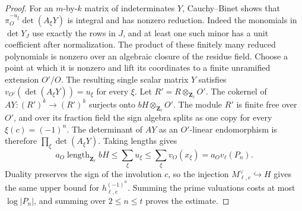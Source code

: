 \begin{proof}
For an \(m\)-by-\(k\) matrix of indeterminates \(Y\), Cauchy--Binet
shows that \(\pi_O^{-u_\xi}\det(A_\xi Y)\) is integral and has nonzero
reduction. Indeed the monomials in \(\det Y_J\) use exactly the rows
in \(J\), and at least one such minor has a unit coefficient after
normalization. The product of these finitely many reduced polynomials
is nonzero over an algebraic closure of the residue field. Choose a
point at which it is nonzero and lift its coordinates to a finite
unramified extension \(O'/O\). The resulting single scalar matrix
\(Y\) satisfies \(v_{O'}(\det(A_\xi Y))=u_\xi\) for every \(\xi\).
Let \(R'=R\otimes_{\mathbf Z_\ell}O'\). The cokernel of
\(AY:(R')^k\to(R')^k\) surjects onto \(bH\otimes_{\mathbf Z_\ell}O'\).
The module \(R'\) is finite free over \(O'\), and over its fraction
field the sign algebra splits as one copy for every \(\xi(c)=(-1)^n\).
The determinant of \(AY\) as an \(O'\)-linear endomorphism is therefore
\(\prod_\xi\det(A_\xi Y)\). Taking lengths gives
\[
 a_O\operatorname{length}_{\mathbf Z_\ell} bH
 \le \sum_\xi u_\xi\le \sum_\xi v_O(x_\xi)=a_Ov_\ell(P_n).
\]
Duality preserves the sign of the involution \(c\), so the injection
\(M_{\ell,e}^{\vee}\hookrightarrow H\) gives the same upper bound for
\(h_{\ell,e}^{(-1)^n}\). Summing the prime valuations costs at most
\(\log|P_n|\), and summing over \(2\le n\le t\) proves the estimate.
\end{proof}

